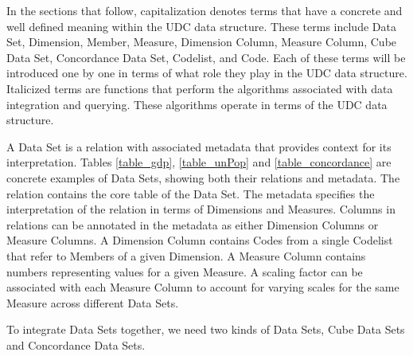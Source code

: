 In the sections that follow, capitalization denotes terms that have a concrete and well defined meaning within the UDC data structure. These terms include Data Set, Dimension, Member, Measure, Dimension Column, Measure Column, Cube Data Set, Concordance Data Set, Codelist, and Code. Each of these terms will be introduced one by one in terms of what role they play in the UDC data structure. Italicized terms are functions that perform the algorithms associated with data integration and querying. These algorithms operate in terms of the UDC data structure.

A Data Set is a relation with associated metadata that provides context for its interpretation. Tables \ref{table_gdp}, \ref{table_unPop} and \ref{table_concordance} are concrete examples of Data Sets, showing both their relations and metadata. The relation contains the core table of the Data Set. The metadata specifies the interpretation of the relation in terms of Dimensions and Measures. Columns in relations can be annotated in the metadata as either Dimension Columns or Measure Columns. A Dimension Column contains Codes from a single Codelist that refer to Members of a given Dimension. A Measure Column contains numbers representing values for a given Measure. A scaling factor can be associated with each Measure Column to account for varying scales for the same Measure across different Data Sets.

To integrate Data Sets together, we need two kinds of Data Sets, Cube Data Sets and Concordance Data Sets.


